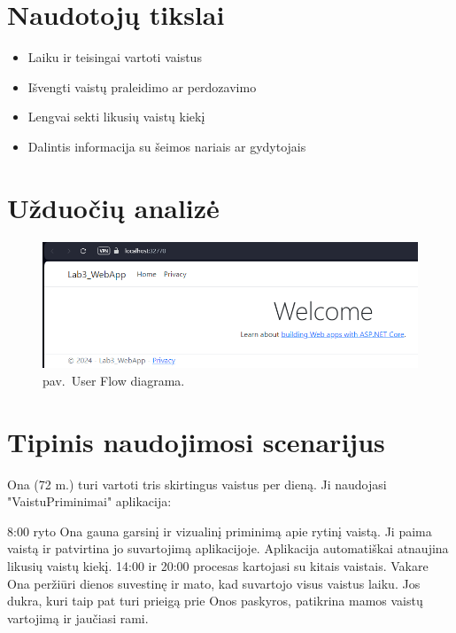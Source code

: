 \documentclass[14pt]{extarticle}
\renewcommand{\thefigure}{\arabic{figure} pav.}
\begin{document}
\clearpage

\section{Naudotojų tikslai}

\begin{itemize}
	\item Laiku ir teisingai vartoti vaistus
	\item Išvengti vaistų praleidimo ar perdozavimo
	\item Lengvai sekti likusių vaistų kiekį
	\item Dalintis informacija su šeimos nariais ar gydytojais
\end{itemize}

\clearpage

\section{Užduočių analizė}

\begin{figure}[!htbp]
	\includegraphics[width=5.5in]{images/flow.png}
	\caption{\thefigure\ User Flow diagrama.}
\end{figure}

\clearpage

\section{Tipinis naudojimosi scenarijus}

Ona (72 m.) turi vartoti tris skirtingus vaistus per dieną. Ji naudojasi "VaistuPriminimai" aplikacija:

8:00 ryto Ona gauna garsinį ir vizualinį priminimą apie rytinį vaistą.
Ji paima vaistą ir patvirtina jo suvartojimą aplikacijoje.
Aplikacija automatiškai atnaujina likusių vaistų kiekį.
14:00 ir 20:00 procesas kartojasi su kitais vaistais.
Vakare Ona peržiūri dienos suvestinę ir mato, kad suvartojo visus vaistus laiku.
Jos dukra, kuri taip pat turi prieigą prie Onos paskyros, patikrina mamos vaistų vartojimą ir jaučiasi rami.
\end{document}
